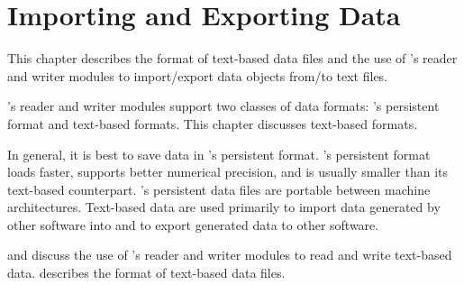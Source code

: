 %
% 
% 
% 
% 
% 
%


\chapter{Importing and Exporting \sr{} Data}
\label{ch:import_export} 

This chapter describes the format of text-based data files and the use
of \sr{}'s reader and writer modules to import/export \sr{} data
objects from/to text files. 

\sr{}'s reader and writer modules support two classes of data formats:
\sr{}'s persistent format and text-based formats.  This chapter
discusses text-based formats.

In general, it is best to save data in \sr{}'s persistent
format.  \sr{}'s persistent format loads faster, supports better
numerical precision, and is usually smaller than its text-based
counterpart.  \sr{}'s persistent data files are portable between machine
architectures.  Text-based data are used primarily to import data
generated by other software into \sr{} and to export \sr{} generated
data to other software.

 and  discuss the use of \sr{}'s reader and
writer modules to read and write text-based data.
 describes
the format of text-based data files.


